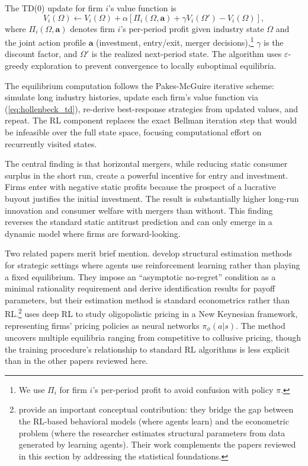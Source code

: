 The TD(0) update for firm $i$'s value function is
\begin{equation}
V_i(\Omega) \leftarrow V_i(\Omega) + \alpha\left[\Pi_i(\Omega, \mathbf{a}) + \gamma V_i(\Omega') - V_i(\Omega)\right], \label{eq:hollenbeck_td}
\end{equation}
where $\Pi_i(\Omega, \mathbf{a})$ denotes firm $i$'s per-period profit given industry state $\Omega$ and the joint action profile $\mathbf{a}$ (investment, entry/exit, merger decisions),\footnote{We use $\Pi_i$ for firm $i$'s per-period profit to avoid confusion with policy $\pi$.} $\gamma$ is the discount factor, and $\Omega'$ is the realized next-period state. The algorithm uses $\varepsilon$-greedy exploration to prevent convergence to locally suboptimal equilibria.

The equilibrium computation follows the Pakes-McGuire iterative scheme: simulate long industry histories, update each firm's value function via (\ref{eq:hollenbeck_td}), re-derive best-response strategies from updated values, and repeat. The RL component replaces the exact Bellman iteration step that would be infeasible over the full state space, focusing computational effort on recurrently visited states.

The central finding is that horizontal mergers, while reducing static consumer surplus in the short run, create a powerful incentive for entry and investment. Firms enter with negative static profits because the prospect of a lucrative buyout justifies the initial investment. The result is substantially higher long-run innovation and consumer welfare with mergers than without. This finding reverses the standard static antitrust prediction and can only emerge in a dynamic model where firms are forward-looking.

Two related papers merit brief mention. \citet{LomysMagnolfi2024} develop structural estimation methods for strategic settings where agents use reinforcement learning rather than playing a fixed equilibrium. They impose an ``asymptotic no-regret'' condition as a minimal rationality requirement and derive identification results for payoff parameters, but their estimation method is standard econometrics rather than RL.\footnote{\citet{LomysMagnolfi2024} provide an important conceptual contribution: they bridge the gap between the RL-based behavioral models (where agents learn) and the econometric problem (where the researcher estimates structural parameters from data generated by learning agents). Their work complements the papers reviewed in this section by addressing the statistical foundations.} \citet{Covarrubias2022} uses deep RL to study oligopolistic pricing in a New Keynesian framework, representing firms' pricing policies as neural networks $\pi_\phi(a|s)$. The method uncovers multiple equilibria ranging from competitive to collusive pricing, though the training procedure's relationship to standard RL algorithms is less explicit than in the other papers reviewed here.


